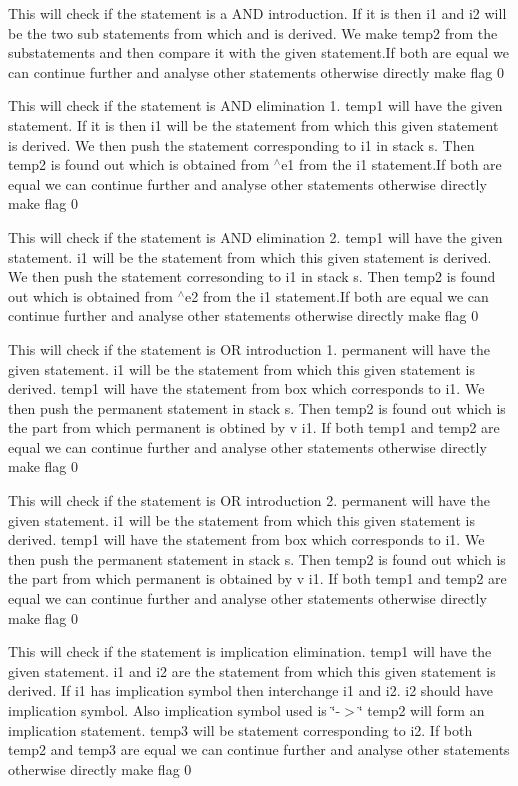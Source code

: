 This will check if the statement is a A\+ND introduction. If it is then i1 and i2 will be the two sub statements from which and is derived. We make temp2 from the substatements and then compare it with the given statement.\+If both are equal we can continue further and analyse other statements otherwise directly make flag 0

This will check if the statement is A\+ND elimination 1. temp1 will have the given statement. If it is then i1 will be the statement from which this given statement is derived. We then push the statement corresponding to i1 in stack s. Then temp2 is found out which is obtained from $^\wedge$e1 from the i1 statement.\+If both are equal we can continue further and analyse other statements otherwise directly make flag 0

This will check if the statement is A\+ND elimination 2. temp1 will have the given statement. i1 will be the statement from which this given statement is derived. We then push the statement corresonding to i1 in stack s. Then temp2 is found out which is obtained from $^\wedge$e2 from the i1 statement.\+If both are equal we can continue further and analyse other statements otherwise directly make flag 0

This will check if the statement is OR introduction 1. permanent will have the given statement. i1 will be the statement from which this given statement is derived. temp1 will have the statement from box which corresponds to i1. We then push the permanent statement in stack s. Then temp2 is found out which is the part from which permanent is obtined by v i1. If both temp1 and temp2 are equal we can continue further and analyse other statements otherwise directly make flag 0

This will check if the statement is OR introduction 2. permanent will have the given statement. i1 will be the statement from which this given statement is derived. temp1 will have the statement from box which corresponds to i1. We then push the permanent statement in stack s. Then temp2 is found out which is the part from which permanent is obtained by v i1. If both temp1 and temp2 are equal we can continue further and analyse other statements otherwise directly make flag 0

This will check if the statement is implication elimination. temp1 will have the given statement. i1 and i2 are the statement from which this given statement is derived. If i1 has implication symbol then interchange i1 and i2. i2 should have implication symbol. Also implication symbol used is \char`\"{}-\/$>$\char`\"{} temp2 will form an implication statement. temp3 will be statement corresponding to i2. If both temp2 and temp3 are equal we can continue further and analyse other statements otherwise directly make flag 0


